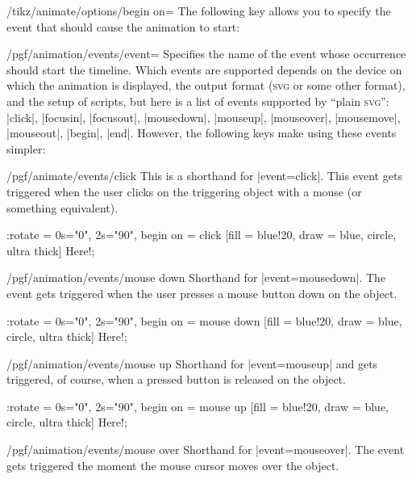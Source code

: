 \begin{key}{/tikz/animate/options/begin on=}
  The following key allows you to specify the event that should cause
  the animation to start:
  \begin{key}{/pgf/animation/events/event=}
    Specifies the name of the event whose occurrence should start the
    timeline. Which events are supported depends on the device on
    which the animation is displayed, the output format
    (\textsc{svg} or some other format), and the setup of scripts, but
    here is a list of events supported by ``plain \textsc{svg}'':
    |click|, |focusin|, |focusout|, |mousedown|,  |mouseup|,
    |mouseover|, |mousemove|, |mouseout|, |begin|, |end|. However, the
    following keys make using these events simpler:
    \begin{key}{/pgf/animate/events/click}
      This is a shorthand for |event=click|. This event gets triggered
      when the user clicks on the triggering object with a mouse (or
      something equivalent).
\begin{codeexample}[width=2cm]
\tikz \node :rotate = { 0s="0", 2s="90", begin on = {click}}
  [fill = blue!20, draw = blue, circle, ultra thick] {Here!}; 
\end{codeexample}
    \end{key}
    \begin{key}{/pgf/animation/events/mouse down}
      Shorthand for |event=mousedown|. The event gets
      triggered when the user presses a mouse button down on the object.
\begin{codeexample}[width=2cm]
\tikz \node :rotate = { 0s="0", 2s="90", begin on = {mouse down}}
  [fill = blue!20, draw = blue, circle, ultra thick] {Here!}; 
\end{codeexample}
    \end{key}
    \begin{key}{/pgf/animation/events/mouse up}
      Shorthand for |event=mouseup| and gets triggered, of course,
      when a pressed button is released on the object.
\begin{codeexample}[width=2cm]
\tikz \node :rotate = { 0s="0", 2s="90", begin on = {mouse up} }
  [fill = blue!20, draw = blue, circle, ultra thick] {Here!}; 
\end{codeexample}
    \end{key}
    \begin{key}{/pgf/animation/events/mouse over}
      Shorthand for |event=mouseover|. The event gets triggered the
      moment the mouse cursor moves over the object.
\begin{codeexample}[width=2cm]

\end{codeexample}
\end{key}
\end{key}
\end{key}
